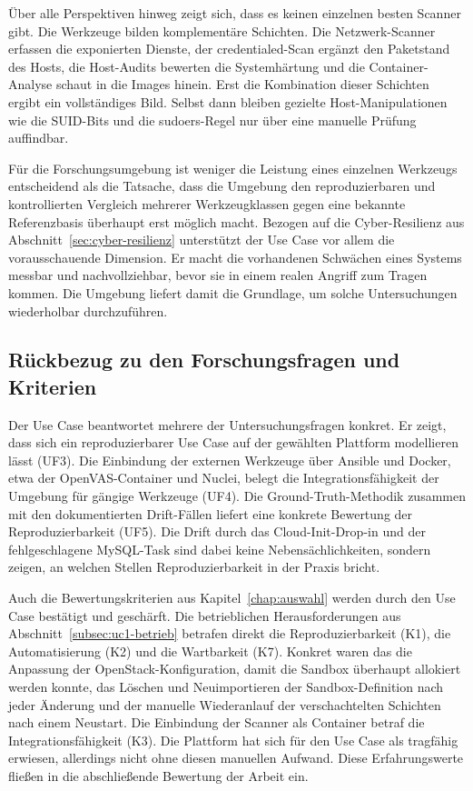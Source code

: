 Über alle Perspektiven hinweg zeigt sich, dass es keinen einzelnen besten Scanner gibt. Die Werkzeuge
bilden komplementäre Schichten. Die Netzwerk-Scanner erfassen die exponierten Dienste, der
credentialed-Scan ergänzt den Paketstand des Hosts, die Host-Audits bewerten die Systemhärtung und
die Container-Analyse schaut in die Images hinein. Erst die Kombination dieser Schichten ergibt ein
vollständiges Bild. Selbst dann bleiben gezielte Host-Manipulationen wie die SUID-Bits und die
sudoers-Regel nur über eine manuelle Prüfung auffindbar.

Für die Forschungsumgebung ist weniger die Leistung eines einzelnen Werkzeugs entscheidend als die
Tatsache, dass die Umgebung den reproduzierbaren und kontrollierten Vergleich mehrerer Werkzeugklassen
gegen eine bekannte Referenzbasis überhaupt erst möglich macht. Bezogen auf die Cyber-Resilienz aus
Abschnitt~\ref{sec:cyber-resilienz} unterstützt der Use Case vor allem die vorausschauende Dimension.
Er macht die vorhandenen Schwächen eines Systems messbar und nachvollziehbar, bevor sie in einem
realen Angriff zum Tragen kommen. Die Umgebung liefert damit die Grundlage, um solche Untersuchungen
wiederholbar durchzuführen.

\subsection{Rückbezug zu den Forschungsfragen und Kriterien}
\label{subsec:uc1-rueckbezug}

Der Use Case beantwortet mehrere der Untersuchungsfragen konkret. Er zeigt, dass sich ein
reproduzierbarer Use Case auf der gewählten Plattform modellieren lässt (UF3). Die Einbindung der
externen Werkzeuge über Ansible und Docker, etwa der OpenVAS-Container und Nuclei, belegt die
Integrationsfähigkeit der Umgebung für gängige Werkzeuge (UF4). Die Ground-Truth-Methodik zusammen
mit den dokumentierten Drift-Fällen liefert eine konkrete Bewertung der Reproduzierbarkeit (UF5). Die
Drift durch das Cloud-Init-Drop-in und der fehlgeschlagene MySQL-Task sind dabei keine Nebensächlichkeiten,
sondern zeigen, an welchen Stellen Reproduzierbarkeit in der Praxis bricht.

Auch die Bewertungskriterien aus Kapitel~\ref{chap:auswahl} werden durch den Use Case bestätigt und
geschärft. Die betrieblichen Herausforderungen aus Abschnitt~\ref{subsec:uc1-betrieb} betrafen direkt
die Reproduzierbarkeit (K1), die Automatisierung (K2) und die Wartbarkeit (K7). Konkret waren das die
Anpassung der OpenStack-Konfiguration, damit die Sandbox überhaupt allokiert werden konnte, das
Löschen und Neuimportieren der Sandbox-Definition nach jeder Änderung und der manuelle Wiederanlauf
der verschachtelten Schichten nach einem Neustart. Die Einbindung der Scanner als Container betraf die
Integrationsfähigkeit (K3). Die Plattform hat sich für den Use Case als tragfähig erwiesen, allerdings
nicht ohne diesen manuellen Aufwand. Diese Erfahrungswerte fließen in die abschließende Bewertung der
Arbeit ein.
